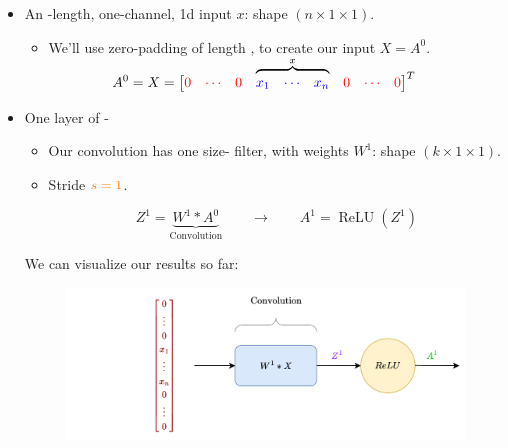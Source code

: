         \begin{itemize}
            \item An -length, one-channel, 1d input $x$: shape $(n \times 1 \times 1)$.

            \begin{itemize}
                \item We'll use zero-padding of length , to create our input $X=A^0$.
            \end{itemize}

            

            \begin{equation}
                A^0 = X = 
                \begin{bmatrix}
                    \red{0} & \red{\cdots} & \red{0} &
                    \smashedoverbrace{
                    \begin{matrix}
                        \blu{x_1} & \blu{\cdots} & \blu{x_n} 
                    \end{matrix}
                    }{x}
                    & \red{0} & \red{\cdots} & \red{0}
                \end{bmatrix}^T
            \end{equation}
        
            \item One layer of -
                \begin{itemize}
                    \item Our convolution has one size- filter, with weights $W^1$: shape $(k \times 1 \times 1)$.
                    \item Stride $\textcolor{orange}{s=1}$.
                    
                        \begin{equation}
                            Z^1 = \underbrace{W^1 \ast A^0}_{\text{Convolution}} 
                            \qquad 
                            \longrightarrow
                            \qquad
                            A^1 = \operatorname{ReLU}(Z^1)
                        \end{equation}
                \end{itemize}
    
            We can visualize our results so far:
    
             \begin{figure}[H]
                \includegraphics[width=.8\textwidth]{images/convolutional_neural_networks_images/partial_cnn.png}
            \end{figure}
                

\end{itemize}
